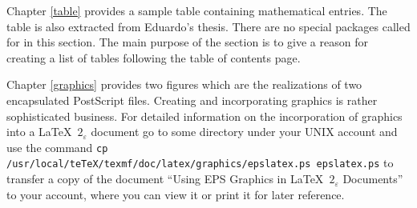 Chapter \ref{table} provides a sample table containing mathematical
entries.  The table is also extracted from Eduardo's thesis.  There
are no special packages called for in this section.  The main purpose
of the section is to give a reason for creating a list of tables
following the table of contents page.

Chapter \ref{graphics} provides two figures which are the realizations 
of two encapsulated PostScript files.  Creating and incorporating
graphics is rather sophisticated business.  For detailed information
on the incorporation of graphics into a \LaTeX\ $2_{\varepsilon}$ document 
go to some directory under your UNIX account and use the command 
\newline
{\tt cp /usr/local/teTeX/texmf/doc/latex/graphics/epslatex.ps
  epslatex.ps}
\newline
to transfer a copy of the document 
``Using EPS Graphics in \LaTeX\ $2_{\varepsilon}$ Documents''
to your account, where you can view it or print it for later reference.



